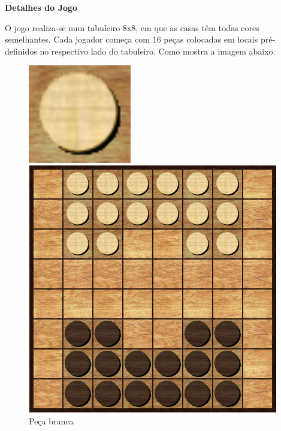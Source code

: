 \documentclass[a4paper]{article}
\begin{document}
\large{\textbf{Detalhes do Jogo}}
\begin{small}

O jogo realiza-se num tabuleiro 8x8, em que as casas têm todas cores semelhantes. Cada jogador começa com 16 peças colocadas em locais pré-definidos no respectivo lado do tabuleiro. Como mostra a imagem abaixo.\newline

\begin{figure}[h!]
  \begin{minipage}[h!]{0.2\textwidth}
    \includegraphics[width=0.4\textwidth]{res/white_piece.png}
    \centering
    \caption{Peça branca}
    \label{fig:2}
  \end{minipage}
	\quad\quad\quad
  \begin{minipage}[h!]{0.2\textwidth}
    \includegraphics[width=\textwidth]{res/board.png}

\end{minipage}
\end{figure}
\end{small}
\end{document}
